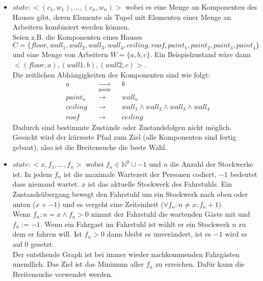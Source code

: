 \documentclass[12pt, paper=a4]{article}
\begin{document}
\begin{itemize}
\item $state: <(c_1, w_1), ..., (c_n, w_n)>$ wobei es eine Menge an Komponenten des Hauses gibt,
      deren Elemente als Tupel mit Elementen einer Menge an Arbeitern kombiniert werden können.\\
      Seien z.B. die Komponenten eines Hauses\\
      $C=\{floor, wall_1, wall_2, wall_3, wall_4, ceiling, roof, paint_1, paint_2,
      paint_3, paint_4\}$ und eine Menge von Arbeitern $W=\{a, b, c\}$.
      Ein Beispielzustand wäre dann $<(floor, a), (wall 1, b), (wall 2, c)>$.\\
      Die zeitlichen Abhängigkeiten der Komponenten sind wie folgt:\\
	  \begin{align*}       
      &a       && \underset{\text{needs}}{\longrightarrow} && b\\
      &paint_n && \longrightarrow && wall_n\\
      &ceiling && \longrightarrow && wall_1 \wedge wall_2 \wedge wall_3 \wedge wall_4\\
      &roof    && \longrightarrow && ceiling
      \end{align*}
      Dadurch sind bestimmte Zustände oder Zustandsfolgen nicht möglich.\\
      Gesucht wird der kürzeste Pfad zum Ziel (alle Komponenten sind fertig gebaut), also ist die
      Breitensuche die beste Wahl.

\item $state: <x, f_1, ..., f_n>$ wobei $f_n \in \mathbb{N}^0 \cup -1$ und $n$ die Anzahl der
      Stockwerke ist. In jedem $f_n$ ist die maximale Wartezeit der Personen codiert,
      $-1$ bedeutet dass niemand wartet. $x$ ist das aktuelle Stockwerk des Fahrstuhls. Ein
      Zustandsübergang bewegt den Fahrstuhl um ein Stockwerk nach oben oder unten ($x +- 1$) und
      es vergeht eine Zeiteinheit ($\forall f_n: n \neq x: f_n + 1$).\\
      Wenn $f_n:n=x \wedge f_n > 0$ nimmt der Fahrstuhl die wartenden Gäste mit und $f_n := -1$.
      Wenn ein Fahrgast im Fahrstuhl ist wählt er ein Stockwerk $n$ zu dem er fahren will. Ist
      $f_n > 0$ dann bleibt es unverändert, ist es $-1$ wird es auf $0$ gesetzt.\\
      
      Der entsthende Graph ist bei immer wieder nachkommenden Fahrgästen unendlich. Das Ziel ist
      das Minimum aller $f_n$ zu erreichen. Dafür kann die Breitensuche verwendet werden.
\end{itemize}
\end{document}
